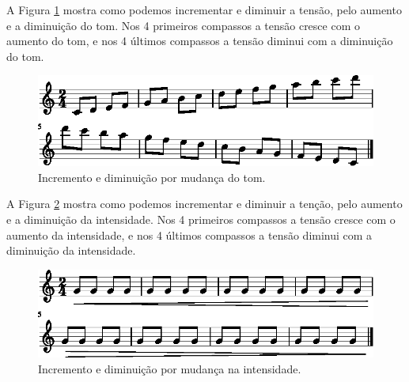 \begin{example}
A Figura \ref{fig:tension-release-tom-1} mostra como podemos incrementar e diminuir a tensão,
pelo aumento e a diminuição do tom. 
Nos 4 primeiros compassos a tensão cresce com o aumento do tom,
e nos 4 últimos compassos a tensão diminui com a diminuição do tom.
\end{example}
\begin{figure}[!h]
     \centering
     \includegraphics[width=1.0\textwidth]{chapters/cap-musica-topicos/tension-release-tom-1.eps}
     \caption{Incremento e diminuição por mudança do tom.}
     \label{fig:tension-release-tom-1}
\end{figure}


\begin{example}
A Figura \ref{fig:tension-release-intensidade-1} mostra como podemos incrementar e diminuir a tenção,
pelo aumento e a diminuição da intensidade. 
Nos 4 primeiros compassos a tensão cresce com o aumento da intensidade,
e nos 4 últimos compassos a tensão diminui com a diminuição da intensidade.
\end{example}
\begin{figure}[!h]
     \centering
     \includegraphics[width=1.0\textwidth]{chapters/cap-musica-topicos/tension-release-intensidade-1.eps}
     \caption{Incremento e diminuição por mudança na intensidade.}
     \label{fig:tension-release-intensidade-1}
\end{figure}



